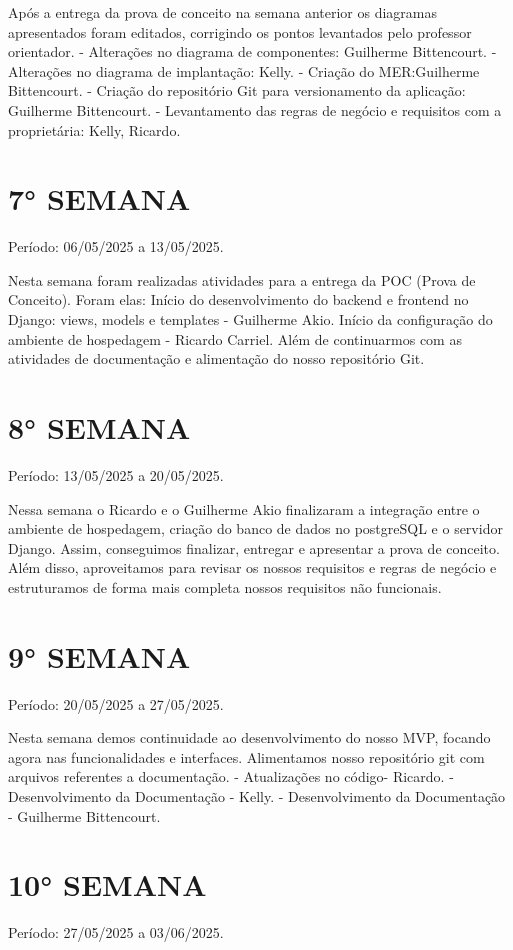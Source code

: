 \documentclass[
	12pt,				%
	openany,			%
	oneside,			%
	a4paper,			%
	english,			%
	french,				%
	spanish,			%
	brazil				%
	]{abntex2}
\begin{document}
\begin{apendicesenv}
Após a entrega da prova de conceito na semana anterior os diagramas apresentados foram editados, corrigindo os pontos levantados 
pelo professor orientador. 
- Alterações no diagrama de componentes: Guilherme Bittencourt.
- Alterações no diagrama de implantação: Kelly.
- Criação do MER:Guilherme Bittencourt.
- Criação do repositório Git para versionamento da aplicação: Guilherme Bittencourt.
- Levantamento das regras de negócio e requisitos com a proprietária:  Kelly, Ricardo.

\section{7° SEMANA}
Período: 06/05/2025 a 13/05/2025.

Nesta semana foram realizadas atividades para a entrega da POC (Prova de Conceito). Foram elas:
Início do desenvolvimento do backend e frontend no Django: views, models e templates - Guilherme Akio.
Início da configuração do ambiente de hospedagem - Ricardo Carriel.
Além de continuarmos com as atividades de documentação e alimentação do nosso repositório Git.

\section{8° SEMANA}
Período: 13/05/2025 a 20/05/2025.

Nessa semana o Ricardo e o Guilherme Akio finalizaram a integração entre o ambiente de hospedagem, criação do banco de dados no postgreSQL e o servidor Django. 
Assim, conseguimos finalizar, entregar e apresentar a prova de conceito. Além disso, aproveitamos para revisar os nossos requisitos e  regras de negócio e 
estruturamos de forma mais completa nossos requisitos não funcionais.

\section{9° SEMANA}
Período: 20/05/2025 a 27/05/2025.

Nesta semana demos continuidade ao desenvolvimento do nosso MVP, focando agora nas funcionalidades e interfaces. Alimentamos nosso repositório git com arquivos referentes a documentação.
- Atualizações no código- Ricardo.
- Desenvolvimento da Documentação - Kelly.
- Desenvolvimento da Documentação - Guilherme Bittencourt.

\section{10° SEMANA}
Período: 27/05/2025 a 03/06/2025.


\end{apendicesenv}
\end{document}
